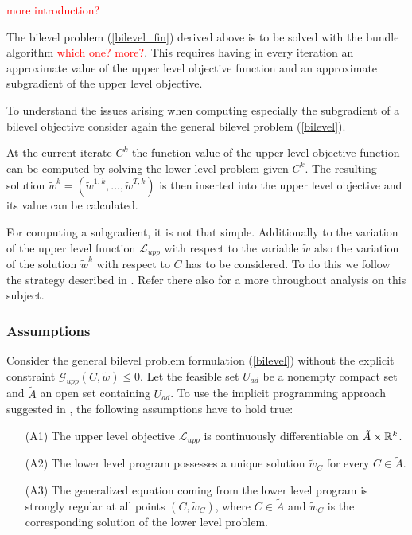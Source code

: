 \textcolor{red}{more introduction?}

The bilevel problem (\ref{bilevel_fin}) derived above is to be solved with the bundle algorithm \textcolor{red}{which one? more?}.
This requires having in every iteration an approximate value of the upper level objective function and an approximate subgradient of the upper level objective.

To understand the issues arising when computing especially the subgradient of a bilevel objective consider again the general bilevel problem (\ref{bilevel}).

At the current iterate \(C^k\) the function value of the upper level objective function can be computed by solving the lower level problem given \(C^k\).
The resulting solution \(\tilde{w}^k = (\tilde{w}^{1,k},...,\tilde{w}^{T,k})\) is then inserted into the upper level objective and its value can be calculated.

For computing a subgradient, it is not that simple. Additionally to the variation of the upper level function \(\mathcal{L}_{upp}\) with respect to the variable \(\tilde{w}\) also the variation of the solution \(\tilde{w}^k\) with respect to \(C\) has to be considered.
To do this we follow the strategy described in \cite{Outrata1998}. Refer there also for a more throughout analysis on this subject.

\subsubsection{Assumptions}

Consider the general bilevel problem formulation (\ref{bilevel}) without the explicit constraint \(\mathcal{G}_{upp}(C,\tilde{w}) \leq 0\).
Let the feasible set \(U_{ad}\) be a nonempty compact set and \(\tilde{A}\) an open set containing \(U_{ad}\).
To use the implicit programming approach suggested in \cite{Outrata1998},  the following assumptions have to hold true:

\begin{itemize}
\item[(A1)] The upper level objective \(\mathcal{L}_{upp}\) is continuously differentiable on \(\tilde{A}\times \mathbb{R}^k\).
\item[(A2)] The lower level program possesses a unique solution \(\tilde{w}_C\) for every \(C\in \tilde{A}\).
\item[(A3)] The generalized equation coming from the lower level program is strongly regular at all points \((C,\tilde{w}_C)\), where \(C \in \tilde{A}\) and \(\tilde{w}_C\) is the corresponding solution of the lower level problem.
\end{itemize}

